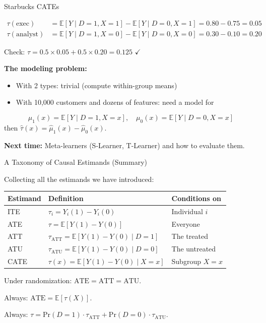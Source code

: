 \documentclass[aspectratio=169, 11pt, handout]{beamer}
\newcommand{\E}{\mathbb{E}}
\newcommand{\Prob}{\mathrm{Pr}}
\begin{document}
\begin{frame}{Starbucks CATEs}

\begin{align*}
\tau(\text{exec}) &= \E[Y \mid D\!=\!1, X\!=\!1] - \E[Y \mid D\!=\!0, X\!=\!1] = 0.80 - 0.75 = 0.05 \\
\tau(\text{analyst}) &= \E[Y \mid D\!=\!1, X\!=\!0] - \E[Y \mid D\!=\!0, X\!=\!0] = 0.30 - 0.10 = 0.20
\end{align*}

Check: $\tau = 0.5 \times 0.05 + 0.5 \times 0.20 = 0.125$ $\checkmark$

\bigskip
\pause

\textbf{The modeling problem:}
\begin{itemize}
    \item With 2 types: trivial (compute within-group means)
    \item With 10,000 customers and dozens of features: need a model for
\end{itemize}
\[
\mu_1(x) = \E[Y \mid D = 1, X = x], \quad \mu_0(x) = \E[Y \mid D = 0, X = x]
\]
then $\hat{\tau}(x) = \hat{\mu}_1(x) - \hat{\mu}_0(x)$.

\bigskip

\textbf{Next time:} Meta-learners (S-Learner, T-Learner) and how to evaluate them.
\end{frame}

\begin{frame}{A Taxonomy of Causal Estimands (Summary)}

Collecting all the estimands we have introduced:

\begin{center}
\begin{tabular}{lll}
\toprule
\textbf{Estimand} & \textbf{Definition} & \textbf{Conditions on} \\
\midrule
ITE & $\tau_i = Y_i(1) - Y_i(0)$ & Individual $i$ \\[0.4em]
ATE & $\tau = \E[Y(1) - Y(0)]$ & Everyone \\[0.4em]
ATT & $\tau_{\text{ATT}} = \E[Y(1) - Y(0) \mid D\!=\!1]$ & The treated \\[0.4em]
ATU & $\tau_{\text{ATU}} = \E[Y(1) - Y(0) \mid D\!=\!0]$ & The untreated \\[0.4em]
CATE & $\tau(x) = \E[Y(1) - Y(0) \mid X\!=\!x]$ & Subgroup $X = x$ \\
\bottomrule
\end{tabular}
\end{center}

\bigskip

Under randomization: $\text{ATE} = \text{ATT} = \text{ATU}$.

\medskip

Always: $\text{ATE} = \E[\tau(X)]$.

\medskip

Always: $\tau = \Prob(D\!=\!1) \cdot \tau_{\text{ATT}} + \Prob(D\!=\!0) \cdot \tau_{\text{ATU}}$.
\end{frame}
\end{document}
